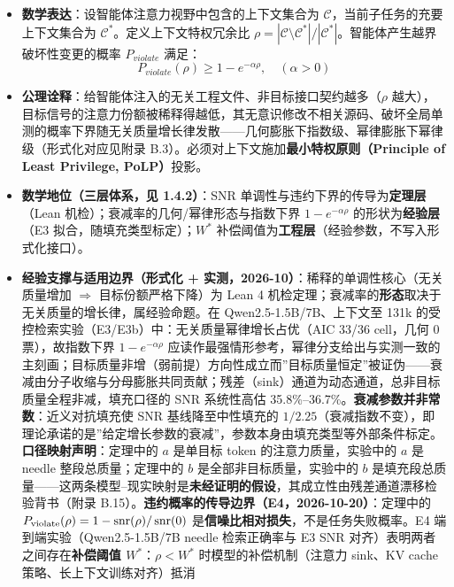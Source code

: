 \documentclass[
]{ctexart}
\providecommand{\tightlist}{%
  \setlength{\itemsep}{0pt}\setlength{\parskip}{0pt}}
\renewcommand{\_}{\discretionary{}{}{\textunderscore}}
\renewcommand{\text}[1]{\textnormal{#1}}
\begin{document}
\begin{itemize}
\tightlist
\item
  \textbf{数学表达}：设智能体注意力视野中包含的上下文集合为
  \(\mathcal{C}\)，当前子任务的充要上下文集合为
  \(\mathcal{C}^*\)。定义上下文特权冗余比
  \(\rho = |\mathcal{C} \setminus \mathcal{C}^*| / |\mathcal{C}^*|\)。智能体产生越界破坏性变更的概率
  \(P_{violate}\) 满足：
  \[ P_{violate}(\rho) \ge 1 - e^{-\alpha \rho}, \quad (\alpha > 0) \]
\item
  \textbf{公理诠释}：给智能体注入的无关工程文件、非目标接口契约越多（\(\rho\)
  越大），目标信号的注意力份额被稀释得越低，其无意识修改不相关源码、破坏全局单测的概率下界随无关质量增长律发散------几何膨胀下指数级、幂律膨胀下幂律级（形式化对应见附录
  B.3）。必须对上下文施加\textbf{最小特权原则（Principle of Least
  Privilege, PoLP）}投影。
\item
  \textbf{数学地位（三层体系，见 1.4.2）}：SNR
  单调性与违约下界的传导为\textbf{定理层}（Lean
  机检）；衰减率的几何/幂律形态与指数下界 \(1-e^{-\alpha\rho}\)
  的形状为\textbf{经验层}（E3 拟合，随填充类型标定）；\(W^*\)
  补偿阈值为\textbf{工程层}（经验参数，不写入形式化接口）。
\item
  \textbf{经验支撑与适用边界（形式化 +
  实测，2026-10）}：稀释的单调性核心（无关质量增加 \(\Rightarrow\)
  目标份额严格下降）为 Lean 4
  机检定理；衰减率的\textbf{形态}取决于无关质量的增长律，属经验命题。在
  Qwen2.5-1.5B/7B、上下文至 131k
  的受控检索实验（E3/E3b）中：无关质量幂律增长占优（AIC 33/36 cell，几何
  0 票），故指数下界 \(1-e^{-\alpha\rho}\)
  应读作最强情形参考，幂律分支给出与实测一致的主刻画；目标质量非增（弱前提）方向性成立而''目标质量恒定''被证伪------衰减由分子收缩与分母膨胀共同贡献；残差（sink）通道为动态通道，总非目标质量全程非减，填充口径的
  SNR 系统性高估
  35.8\%--36.7\%。\textbf{衰减参数并非常数}：近义对抗填充使 SNR
  基线降至中性填充的
  \(1/2.25\)（衰减指数不变），即理论承诺的是''给定增长参数的衰减''，参数本身由填充类型等外部条件标定。\textbf{口径映射声明}：定理中的
  \(a\) 是单目标 token 的注意力质量，实验中的 \(a\) 是 needle
  整段总质量；定理中的 \(b\) 是全部非目标质量，实验中的 \(b\)
  是填充段总质量------这两条模型--现实映射是\textbf{未经证明的假设}，其成立性由残差通道漂移检验背书（附录
  B.15）。\textbf{违约概率的传导边界（E4，2026-10-20）}：定理中的
  \(P_{\text{violate}}(\rho) = 1 - \operatorname{snr}(\rho)/\operatorname{snr}(0)\)
  是\textbf{信噪比相对损失}，不是任务失败概率。E4
  端到端实验（Qwen2.5-1.5B/7B needle 检索正确率与 E3 SNR
  对齐）表明两者之间存在\textbf{补偿阈值 \(W^*\)}：\(\rho < W^*\)
  时模型的补偿机制（注意力 sink、KV cache 策略、长上下文训练对齐）抵消

\end{itemize}
\end{document}
